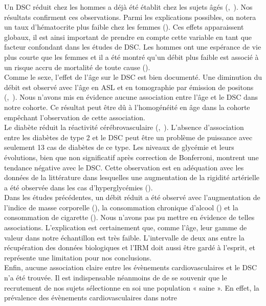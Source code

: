 Un DSC réduit chez les hommes a déjà été établit chez les sujets âgés (\cite{Liu2012},~\cite{Chen2011}). Nos résultats
confirment ces observations. Parmi les explications possibles, on notera un taux d’hématocrite plus
faible chez les femmes (\cite{Liu2012}). Ces effets apparaissent globaux, il est ainsi important de prendre en
compte cette variable en tant que facteur confondant dans les études de DSC. Les hommes ont une
espérance de vie plus courte que les femmes et il a été montré qu’un débit plus faible est associé à un
risque accru de mortalité de toute cause (\cite{Sabayan2013}).\\
Comme le sexe, l’effet de l’âge sur le DSC est bien documenté. Une diminution du débit est
observé avec l’âge en ASL et en tomographie par émission de positons (\cite{Chen2011},~\cite{Martin1991}). Nous n’avons mis
en évidence aucune association entre l’âge et le DSC dans notre cohorte. Ce résultat peut être dû à
l’homogénéité en âge dans la cohorte empêchant l’observation de cette association.\\
Le diabète réduit la réactivité cérébrovasculaire (\cite{Dandona1978},~\cite{Fulesdi1997}). L’absence d’association entre les
diabètes de type 2 et le DSC peut être un problème de puissance avec seulement 13 cas de diabètes
de ce type. Les niveaux de glycémie et leurs évolutions, bien que non significatif après correction de
Bonferroni, montrent une tendance négative avec le DSC. Cette observation est en adéquation avec
les données de la littérature dans lesquelles une augmentation de la rigidité artérielle a été observée
dans les cas d’hyperglycémies (\cite{Rubin2012}).\\
Dans les études précédentes, un débit réduit a été observé avec l’augmentation de l’indice de
masse corporelle (\cite{Willeumier2011}), la consommation chronique d’alcool (\cite{Schmidt2012}) et la consommation de cigarette
(\cite{Kubota1983}). Nous n’avons pas pu mettre en évidence de telles associations. L’explication est certainement
que, comme l’âge, leur gamme de valeur dans notre échantillon est très faible. L’intervalle de deux ans
entre la récupération des données biologiques et l’IRM doit aussi être gardé à l’esprit, et représente
une limitation pour nos conclusions.\\
Enfin, aucune association claire entre les évènements cardiovasculaires et le DSC n’a été
trouvée. Il est indispensable néanmoins de de se souvenir que le recrutement de nos sujets sélectionne
en soi une population « saine ». En effet, la prévalence des évènements cardiovasculaires dans notre
